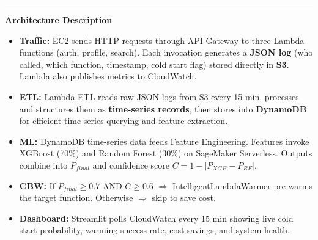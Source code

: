 \documentclass[10pt,a4paper]{article}
\begin{document}
\vspace{0.05cm}
\noindent\rule{\linewidth}{0.6pt}

\noindent\textbf{Architecture Description}\vspace{2pt}

\begin{itemize}[leftmargin=1.4em, itemsep=0pt, topsep=1pt]
\item \textbf{Traffic:} EC2 sends HTTP requests through API Gateway to three Lambda functions (auth, profile, search). Each invocation generates a \textbf{JSON log} (who called, which function, timestamp, cold start flag) stored directly in \textbf{S3}. Lambda also publishes metrics to CloudWatch.
\item \textbf{ETL:} Lambda ETL reads raw JSON logs from S3 every 15 min, processes and structures them as \textbf{time-series records}, then stores into \textbf{DynamoDB} for efficient time-series querying and feature extraction.
\item \textbf{ML:} DynamoDB time-series data feeds Feature Engineering. Features invoke XGBoost (70\%) and Random Forest (30\%) on SageMaker Serverless. Outputs combine into $P_{final}$ and confidence score $C = 1 - |P_{XGB} - P_{RF}|$.
\item \textbf{CBW:} If $P_{final}\!\geq\!0.7$ AND $C\!\geq\!0.6$ $\Rightarrow$ IntelligentLambdaWarmer pre-warms the target function. Otherwise $\Rightarrow$ skip to save cost.
\item \textbf{Dashboard:} Streamlit polls CloudWatch every 15 min showing live cold start probability, warming success rate, cost savings, and system health.
\end{itemize}
\end{document}

